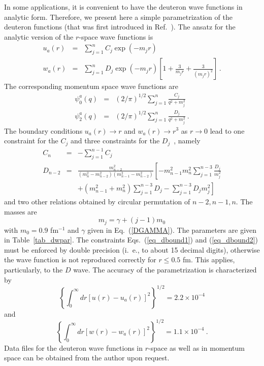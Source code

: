 In some applications, it is convenient to have the deuteron
wave functions in analytic form. Therefore, we present here
a simple parametrization of the deuteron functions (that was first introduced
in Ref.~\cite{Lac81}).
The ansatz for the analytic version of the $r$-space wave functions is
\begin{eqnarray}
u_{a}(r) & = & \sum^{n}_{j=1} C_{j} \exp (-m_{j}r)\\
w_{a}(r) & = & \sum^{n}_{j=1} D_{j} \exp (-m_{j}r)
\left[1+\frac{3}{m_{j}r}+\frac{3}{(m_{j}r)^{2}}\right] \, .
\end{eqnarray}
The corresponding momentum space wave functions are
\begin{eqnarray}
\psi^{a}_{0}(q) & = & (2/\pi)^{1/2}
\sum_{j=1}^{n} \frac{C_{j}}{q^{2}+m^{2}_{j}}\\
\psi^{a}_{2}(q) & = & (2/\pi)^{1/2}
\sum_{j=1}^{n} \frac{D_{j}}{q^{2}+m^{2}_{j}}
\: .
\end{eqnarray}
The boundary conditions $u_{a}(r) \rightarrow r$ and
$w_{a}(r)\rightarrow r^{3}$ as $r\rightarrow 0$ lead to one constraint
for the $C_{j}$ and three constraints for the $D_{j}$~\cite{Lac81}, namely
\begin{eqnarray}
C_{n} & = & -\sum_{j=1}^{n-1} C_{j}
\label{eq_dbound1}
\\
D_{n-2} & = & \frac{m^{2}_{n-2}}{(m^{2}_{n}-m^{2}_{n-2})
(m^{2}_{n-1}-m^{2}_{n-2})} \left[ -m^{2}_{n-1}m^{2}_{n}\sum_{j=1}^{n-3}
\frac{D_{j}}{m^{2}_{j}}
\right.
\nonumber \\
 & & 
\left.
+(m^{2}_{n-1}+m^{2}_{n})\sum_{j=1}^{n-3}D_{j}
-\sum_{j=1}^{n-3}D_{j}m^{2}_{j} \right]
\label{eq_dbound2}
\end{eqnarray}
and two other relations obtained by circular permutation of
$n-2, n-1, n$. The masses are
\begin{equation}
m_{j}=\gamma+(j-1)m_{0}
\end{equation}
with $m_{0}=0.9$ fm$^{-1}$ and $\gamma$ given in Eq.~(\ref{DGAMMA}).
The parameters are given in Table~\ref{tab_dwpar}.
The constraints Eqs.~(\ref{eq_dbound1}) and (\ref{eq_dbound2})
must be enforced by double precision (i.~e., to about 15 decimal
digits), otherwise the wave function is not reproduced correctly
for $r\leq 0.5$ fm. This applies, particularly, to the $D$ wave.
The accuracy of the parametrization is characterized by
\begin{equation}
\left\{\int_0^\infty dr \left[ u(r) - u_a(r) \right]^2\right\}^{1/2}
= 2.2 \times 10^{-4}
\end{equation}
and
\begin{equation}
\left\{\int_0^\infty dr \left[ w(r) - w_a(r) \right]^2\right\}^{1/2}
= 1.1 \times 10^{-4} \: .
\end{equation}
Data files for the deuteron wave functions in $r$-space as well as in
momentum space can be obtained from the author upon request.





